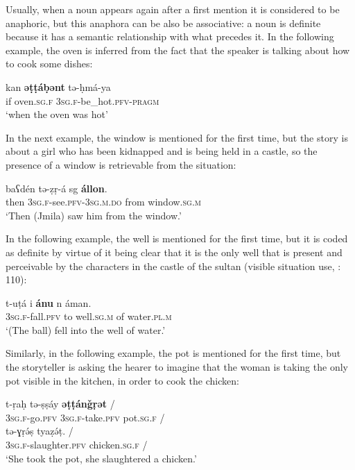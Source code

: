 \documentclass[output=paper]{langsci/langscibook}
\begin{document}
Usually, when a noun appears again after a first mention it is considered to be anaphoric, but this anaphora can be also be associative: a noun is definite because it has a semantic relationship with what precedes it. In the following example, the oven is inferred from the fact that the speaker is talking about how to cook some dishes:

\begin{exe}
\ex\label{5ex:18}
\gll	kan	{\textbf{əṭṭáḅənt}}	tə-ḥmá-ya \\
	if	oven.{\textsc{sg.f}}	{\textsc{3sg.f}}-be\_hot.{\textsc{pfv-pragm}} \\
\glt	`when the oven was hot'
\end{exe}

In the next example, the window is mentioned for the first time, but the story is about a girl who has been kidnapped and is being held in a castle, so the presence of a window is retrievable from the situation:

\begin{exe}
\ex\label{5ex:19}
\gll	baʕdén tə-ẓṛ-á sg {\textbf{állon}}. \\
	then 3{\textsc{sg.f}}-see.{\textsc{pfv-3sg.m.do}} from window.{\textsc{sg.m}} \\
\glt	`Then (Jmila) saw him from the window.'
\end{exe}

In the following example, the well is mentioned for the first time, but it is coded as definite by virtue of it being clear that it is the only well that is present and perceivable by the characters in the castle of the sultan (visible situation use, \citealt{hawkins:78}: 110):

\begin{exe}
\ex\label{5ex:20}
\gll	t-uṭá	i	{\textbf{ánu}}	n	áman. \\
	3{\textsc{sg.f}}-fall.{\textsc{pfv}}	to	well.{\textsc{sg.m}}	of	water.{\textsc{pl.m}} \\
\glt	`(The ball) fell into the well of water.'
\end{exe}

Similarly, in the following example, the pot is mentioned for the first time, but the storyteller is asking the hearer to imagine that the woman is taking the only pot visible in the kitchen, in order to cook the chicken:

\begin{exe}
\ex\label{5ex:21}
\gll	t-ṛaḥ	tə-ṣṣáy	{\textbf{əṭṭánǧṛət}}	/ \\
	{\textsc{3sg.f}}-go.{\textsc{pfv}}	{\textsc{3sg.f}}-take.{\textsc{pfv}}	pot.{\textsc{sg.f}}	/ \\
\glt
\exi{}
\gll	tə-ɣṛə́ṣ	tyaẓə́ṭ.	/ \\
	{\textsc{3sg.f}}-slaughter.{\textsc{pfv}}	chicken.{\textsc{sg.f}}	/ \\
\glt	`She took the pot, she slaughtered a chicken.'
\end{exe}
\end{document}
